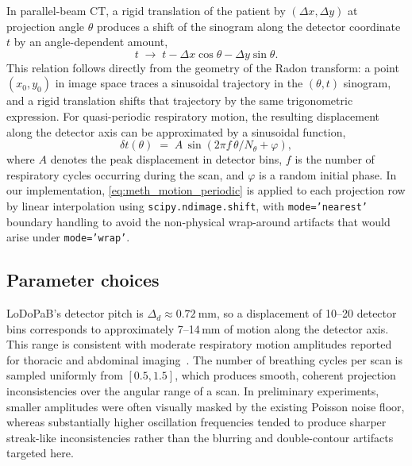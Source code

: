 In parallel-beam CT, a rigid translation of the patient by $(\Delta x, \Delta y)$ at projection angle $\theta$ produces a shift of the sinogram along the detector coordinate $t$ by an angle-dependent amount,
\begin{equation}
    t \;\longrightarrow\; t - \Delta x\cos\theta - \Delta y\sin\theta.
    \label{eq:meth_motion_shift}
\end{equation}
This relation follows directly from the geometry of the Radon transform: a point $(x_0, y_0)$ in image space traces a sinusoidal trajectory in the $(\theta,t)$ sinogram, and a rigid translation shifts that trajectory by the same trigonometric expression. For quasi-periodic respiratory motion, the resulting displacement along the detector axis can be approximated by a sinusoidal function,
\begin{equation}
    \delta t(\theta) \;=\; A \,\sin\!\left(2\pi f\,\theta / N_\theta + \varphi\right),
    \label{eq:meth_motion_periodic}
\end{equation}
where $A$ denotes the peak displacement in detector bins, $f$ is the number of respiratory cycles occurring during the scan, and $\varphi$ is a random initial phase. In our implementation, \eqref{eq:meth_motion_periodic} is applied to each projection row by linear interpolation using \texttt{scipy.ndimage.shift}, with \texttt{mode='nearest'} boundary handling to avoid the non-physical wrap-around artifacts that would arise under \texttt{mode='wrap'}.

\subsection{Parameter choices}

\mbox{LoDoPaB}'s detector pitch is $\Delta_d \approx \SI{0.72}{\milli\metre}$, so a displacement of 10--20 detector bins corresponds to approximately 7--14\,mm of motion along the detector axis. This range is consistent with moderate respiratory motion amplitudes reported for thoracic and abdominal imaging~\cite{Lu2005}. The number of breathing cycles per scan is sampled uniformly from $[0.5, 1.5]$, which produces smooth, coherent projection inconsistencies over the angular range of a scan. In preliminary experiments, smaller amplitudes were often visually masked by the existing Poisson noise floor, whereas substantially higher oscillation frequencies tended to produce sharper streak-like inconsistencies rather than the blurring and double-contour artifacts targeted here.

